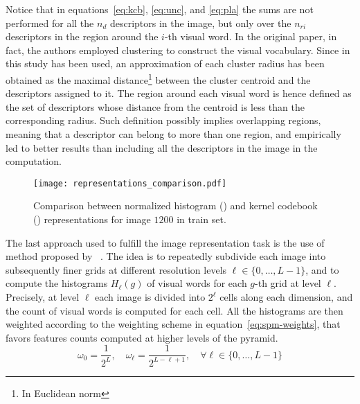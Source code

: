 \documentclass[../main.tex]{subfiles}
\begin{document}
Notice that in equations~\ref{eq:kcb}, \ref{eq:unc}, and \ref{eq:pla} the sums are not performed for all the
$n_{d}$ descriptors in the image, but only over the $n_{ri}$ descriptors in the
region around the $i$-th visual word. 
In the original paper, in fact, the authors employed  clustering to construct the visual vocabulary. 
Since in this study  has been used, an approximation of each
cluster radius has been obtained as the maximal distance\footnote{In Euclidean
norm} between the cluster centroid and the descriptors assigned to it. The
region around each visual word is hence defined as the set of descriptors whose
distance from the centroid is less than the corresponding radius. Such
definition possibly implies overlapping regions, meaning that a descriptor can
belong to more than one region, and empirically led to better
results than including all the descriptors in the image in the computation.

\begin{figure}[htb]
  \centering
  \texttt{[image: representations\_comparison.pdf]}
  \caption{Comparison between normalized histogram () and kernel
  codebook () representations for image $1200$ in train set.}\label{fig:hist-kcb-example}
\end{figure}


\pagebreak
The last approach used to fulfill the image representation task is the
use of  method proposed by ~\cite{lazebnik}. 
The idea is to repeatedly subdivide each image into
subsequently finer grids at different resolution levels $\ell \in
\{0,\dots,L-1\}$, and to compute the histograms $H_{\ell}(g)$ of visual words
for each $g$-th grid at level $\ell$. Precisely, at level $\ell$ each
image is divided into $2^{\ell}$ cells along each dimension, and the count of
visual words is computed for each cell.
All the histograms are then weighted according to the weighting
scheme in equation~\ref{eq:spm-weights},
that favors features counts computed at higher levels
of the pyramid. 
\begin{equation}\label{eq:spm-weights}
	\omega_0 = \frac{1}{2^{L}},
	\quad
	\omega_{\ell} = \frac{1}{2^{L-\ell+1}},
	\quad
	\forall \ell \in \{0, \ldots, L-1\}
\end{equation}
\end{document}

